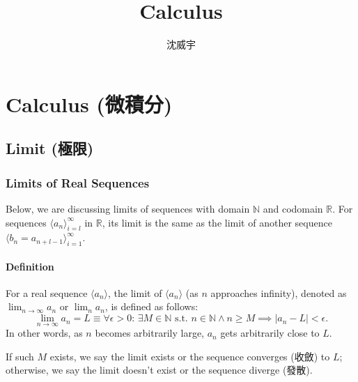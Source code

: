\documentclass[a4paper,12pt]{report}
\begin{document}
\title{Calculus}
\author{沈威宇}
\date{\temtoday}
\titletocdoc
\chapter{Calculus (微積分)}
\section{Limit (極限)}
\subsection{Limits of Real Sequences}
Below, we are discussing limits of sequences with domain $\mathbb{N}$ and codomain $\mathbb{R}$. For sequences $\langle a_n\rangle_{i=l}^\infty$ in $\mathbb{R}$, its limit is the same as the limit of another sequence $\langle b_n=a_{n+l-1}\rangle_{i=1}^\infty$.
\subsubsection{Definition}
For a real sequence \(\langle a_n\rangle\), the limit of \(\langle a_n\rangle\) (as $n$ approaches infinity), denoted as $\lim_{n \to \infty} a_n$ or $\lim_n a_n$, is defined as follows:
\[\lim_{n \to \infty} a_n = L \equiv \forall \epsilon > 0:\, \exists M \in\mathbb{N}\text{\ s.t.\ } n\in\mathbb{N}\land n \geq M\implies |a_n - L| < \epsilon.\]
In other words, as \(n\) becomes arbitrarily large, \(a_n\) gets arbitrarily close to \(L\).

If such $M$ exists, we say the limit exists or the sequence converges (收斂) to $L$; otherwise, we say the limit doesn't exist or the sequence diverge (發散).
\end{document}
